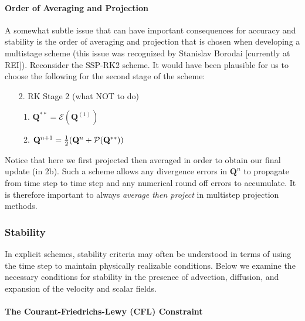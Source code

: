\documentclass[11pt]{article}
\begin{document}
\paragraph{Order of Averaging and Projection} A somewhat subtle issue that can have important consequences for accuracy and stability is the order of averaging and projection that is chosen when developing a multistage scheme (this issue was recognized by Stanislav Borodai [currently at REI]). Reconsider the SSP-RK2 scheme. It would have been plausible for us to choose the following for the second stage of the scheme:
\begin{enumerate}
\item[2.] RK Stage 2 (what NOT to do)
    \begin{enumerate}
    \item $\mathbf{Q}^{**} = \mathcal{E}(\mathbf{Q}^{(1)})$
    \item $\mathbf{Q}^{n+1} = \mbox{$\frac{1}{2}$} (\mathbf{Q}^n + \mathcal{P}(\mathbf{Q}^{**}))$
    \end{enumerate}
\end{enumerate}
Notice that here we first projected then averaged in order to obtain our final update (in 2b).  Such a scheme allows any divergence errors in $\mathbf{Q}^n$ to propagate from time step to time step and any numerical round off errors to accumulate.  It is therefore important to always \emph{average then project} in multistep projection methods.

\subsubsection{Stability}

In explicit schemes, stability criteria may often be understood in terms of using the time step to maintain physically realizable conditions.  Below we examine the necessary conditions for stability in the presence of advection, diffusion, and expansion of the velocity and scalar fields.

\paragraph{The Courant-Friedrichs-Lewy (CFL) Constraint}
\end{document}
